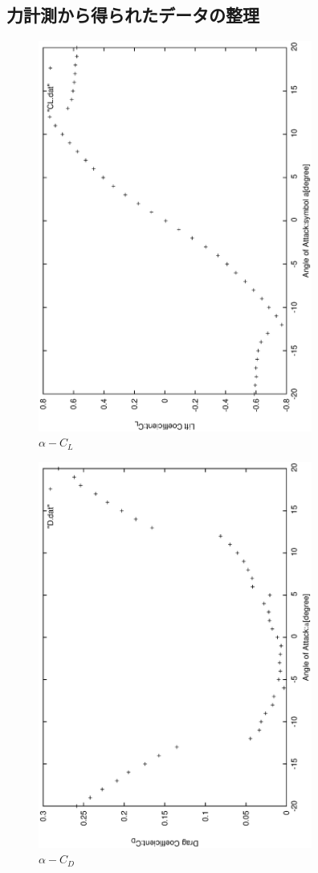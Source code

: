 \documentclass[a4j,twoside,openright,11pt]{jarticle}
\begin{document}
\subsection{力計測から得られたデータの整理}
\newpage
\begin{figure}[htbp]
\begin{center}
\includegraphics[width=9cm,angle=-90]{./CL/CL.eps}
\end{center}
\caption{$\alpha - C_L$}
\end{figure}

\begin{figure}[htbp]
\begin{center}
\includegraphics[width=9cm,angle=-90]{./CD/CD.eps}
\end{center}
\caption{$\alpha - C_D$}
\end{figure}
\end{document}

